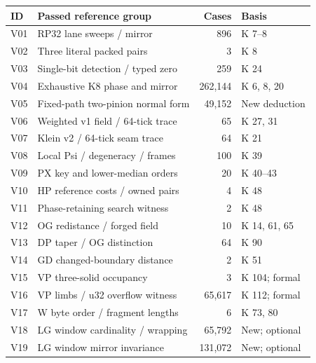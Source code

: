 \begin{longtable}{L{10mm}L{77mm}r L{35mm}}
\toprule
\textbf{ID}&\textbf{Passed reference group}&\textbf{Cases}&\textbf{Basis}\\\midrule\endhead
V01&RP32 lane sweeps / mirror&896&K 7--8\\
V02&Three literal packed pairs&3&K 8\\
V03&Single-bit detection / typed zero&259&K 24\\
V04&Exhaustive K8 phase and mirror&262,144&K 6, 8, 20\\
V05&Fixed-path two-pinion normal form&49,152&New deduction\\
V06&Weighted v1 field / 64-tick trace&65&K 27, 31\\
V07&Klein v2 / 64-tick seam trace&64&K 21\\
V08&Local Psi / degeneracy / frames&100&K 39\\
V09&PX key and lower-median orders&20&K 40--43\\
V10&HP reference costs / owned pairs&4&K 48\\
V11&Phase-retaining search witness&2&K 48\\
V12&OG redistance / forged field&10&K 14, 61, 65\\
V13&DP taper / OG distinction&64&K 90\\
V14&GD changed-boundary distance&2&K 51\\
V15&VP three-solid occupancy&3&K 104; formal\\
V16&VP limbs / u32 overflow witness&65,617&K 112; formal\\
V17&W byte order / fragment lengths&6&K 73, 80\\
V18&LG window cardinality / wrapping&65,792&New; optional\\
V19&LG window mirror invariance&131,072&New; optional\\
\bottomrule
\end{longtable}
